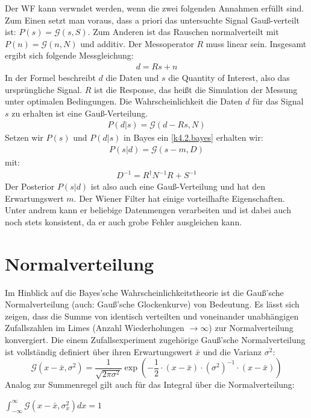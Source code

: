 \documentclass[]{dsadokumentation}
\begin{document}
Der WF kann verwndet werden, wenn die zwei folgenden Annahmen erfüllt sind. Zum Einen setzt man voraus, dass a priori das untersuchte Signal Gauß-verteilt ist: $P(s) = \mathcal{G}(s,S)$. Zum Anderen ist das Rauschen normalverteilt mit $P(n) = \mathcal{G}(n,N)$ und additiv. Der Messoperator $R$ muss linear sein. Insgesamt ergibt sich folgende Messgleichung:
\begin{eqnarray}
d = Rs + n
\end{eqnarray}
In der Formel beschreibt $d$ die Daten und $s$ die Quantity of Interest, also das ursprüngliche Signal. $R$ ist die Response, das heißt die Simulation der Messung unter optimalen Bedingungen. Die Wahrscheinlichkeit die Daten $d$ für das Signal $s$ zu erhalten ist eine Gauß-Verteilung.
\begin{eqnarray}
P(d|s) = \mathcal{G}(d-Rs,N)
\end{eqnarray}
Setzen wir $P(s)$ und $P(d|s)$ in Bayes ein \cref{k4.2.bayes} erhalten wir:
\begin{eqnarray}
P(s|d) = \mathcal{G}(s-m,D)
\end{eqnarray}
mit:
\begin{eqnarray}
D^{-1} = R^{\dagger} N^{-1}R + S^{-1}
\end{eqnarray}
Der Posterior $P(s|d)$ ist also auch eine Gauß-Verteilung und hat den Erwartungswert $m$. Der Wiener Filter hat einige vorteilhafte Eigenschaften. Unter andrem kann er beliebige Datenmengen verarbeiten und ist dabei auch noch stets konsistent, da er auch grobe Fehler ausgleichen kann.



\section{Normalverteilung}

Im Hinblick auf die Bayes'sche Wahrscheinlichkeitstheorie ist die Gauß'sche Normalverteilung (auch: Gauß'sche Glockenkurve) von Bedeutung.
Es lässt sich zeigen, dass die Summe von identisch verteilten und voneinander unabhängigen Zufallszahlen im Limes (Anzahl Wiederholungen $\rightarrow \infty$) zur Normalverteilung konvergiert.
Die einem Zufallsexperiment zugehörige Gauß'sche Normalverteilung ist vollständig definiert über ihren Erwartungswert $\bar{x}$ und die Varianz $\sigma^{2}$:
\[ \mathcal{G} (x - \bar{x}, \sigma^{2}) = \displaystyle\frac{1}{\sqrt{2 \pi \sigma^{2}}} \exp \left(- \displaystyle\frac{1}{2} \cdot (x - \bar{x}) \cdot (\sigma^{2})^{-1} \cdot (x - \bar{x}) \right) \]
Analog zur Summenregel gilt auch für das Integral über die Normalverteilung:
\begin{center} $\int_{- \infty}^{\infty} \mathcal{G} (x - \bar{x}, \sigma _x ^{2}) dx = 1$ \end{center}
\end{document}
